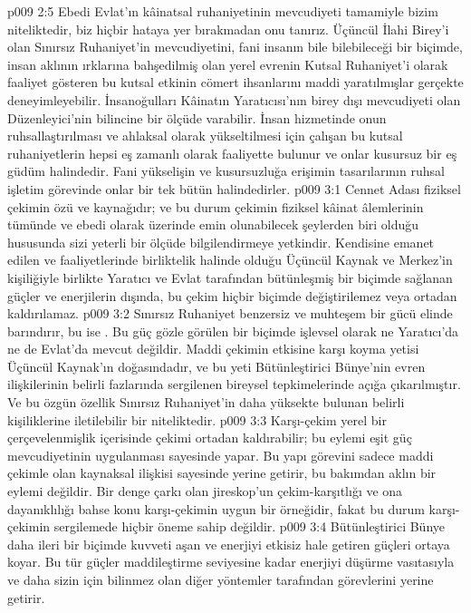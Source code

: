 \vs p009 2:5 Ebedi Evlat’ın kâinatsal ruhaniyetinin mevcudiyeti tamamiyle bizim  niteliktedir, biz hiçbir hataya yer bırakmadan onu tanırız. Üçüncül İlahi Birey’i olan Sınırsız Ruhaniyet’in mevcudiyetini, fani insanın bile bilebileceği bir biçimde, insan aklının ırklarına bahşedilmiş olan yerel evrenin Kutsal Ruhaniyet’i olarak faaliyet gösteren bu kutsal etkinin cömert ihsanlarını maddi yaratılmışlar gerçekte deneyimleyebilir. İnsanoğulları Kâinatın Yaratıcısı’nın birey dışı mevcudiyeti olan Düzenleyici’nin bilincine bir ölçüde varabilir. İnsan hizmetinde onun ruhsallaştırılması ve ahlaksal olarak yükseltilmesi için çalışan bu kutsal ruhaniyetlerin hepsi eş zamanlı olarak faaliyette bulunur ve onlar kusursuz bir eş güdüm halindedir. Fani yükselişin ve kusursuzluğa erişimin tasarılarının ruhsal işletim görevinde onlar bir tek bütün halindedirler.
\vs p009 3:1 Cennet Adası fiziksel çekimin özü ve kaynağıdır; ve bu durum çekimin fiziksel kâinat âlemlerinin tümünde  ve ebedi olarak üzerinde emin olunabilecek şeylerden biri olduğu hususunda sizi yeterli bir ölçüde bilgilendirmeye yetkindir. Kendisine emanet edilen ve faaliyetlerinde birliktelik halinde olduğu Üçüncül Kaynak ve Merkez’in kişiliğiyle birlikte Yaratıcı ve Evlat tarafından bütünleşmiş bir biçimde sağlanan güçler ve enerjilerin dışında, bu çekim hiçbir biçimde değiştirilemez veya ortadan kaldırılamaz.
\vs p009 3:2 Sınırsız Ruhaniyet benzersiz ve muhteşem bir gücü elinde barındırır, bu ise . Bu güç gözle görülen bir biçimde işlevsel olarak ne Yaratıcı’da ne de Evlat’da mevcut değildir. Maddi çekimin etkisine karşı koyma yetisi Üçüncül Kaynak’ın doğasındadır, ve bu yeti Bütünleştirici Bünye’nin evren ilişkilerinin belirli fazlarında sergilenen bireysel tepkimelerinde açığa çıkarılmıştır. Ve bu özgün özellik Sınırsız Ruhaniyet’in daha yüksekte bulunan belirli kişiliklerine iletilebilir bir niteliktedir.
\vs p009 3:3 Karşı\hyp{}çekim yerel bir çerçevelenmişlik içerisinde çekimi ortadan kaldırabilir; bu eylemi eşit güç mevcudiyetinin uygulanması sayesinde yapar. Bu yapı görevini sadece maddi çekimle olan kaynaksal ilişkisi sayesinde yerine getirir, bu bakımdan aklın bir eylemi değildir. Bir denge çarkı olan jireskop’un çekim\hyp{}karşıtlığı ve ona dayanıklılığı bahse konu karşı\hyp{}çekimin  uygun bir örneğidir, fakat bu durum karşı\hyp{}çekimin  sergilemede hiçbir öneme sahip değildir.
\vs p009 3:4 Bütünleştirici Bünye daha ileri bir biçimde kuvveti aşan ve enerjiyi etkisiz hale getiren güçleri ortaya koyar. Bu tür güçler maddileştirme seviyesine kadar enerjiyi düşürme vasıtasıyla ve daha sizin için bilinmez olan diğer yöntemler tarafından görevlerini yerine getirir.

